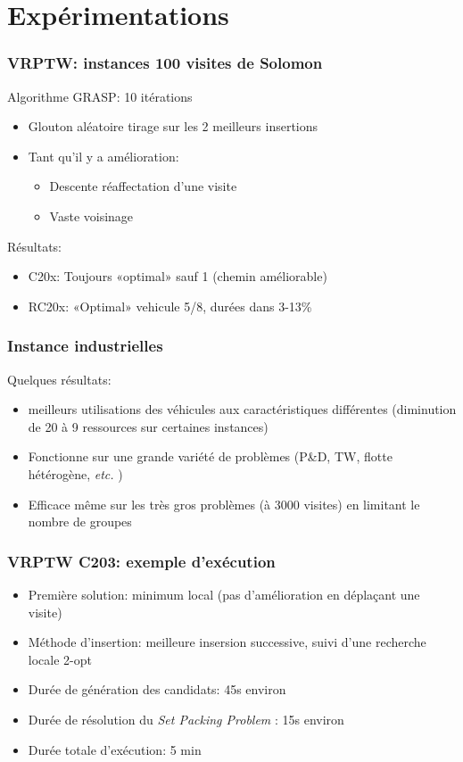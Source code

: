 \documentclass[table]{beamer}
\newcommand*{\foreign}[2][english]{%
    \emph{\foreignlanguage{#1}{#2}}%
}
\begin{document}
\section{Expérimentations}

\begin{frame}
  \frametitle{VRPTW: instances 100 visites de Solomon}

  Algorithme GRASP: 10 itérations
  \begin{itemize}
  \item Glouton aléatoire tirage sur les 2 meilleurs insertions
  \item Tant qu'il y a amélioration:
    \begin{itemize}
    \item Descente réaffectation d'une visite
    \item Vaste voisinage
    \end{itemize}
  \end{itemize}

  Résultats:
  \begin{itemize}
  \item C20x: Toujours «optimal» sauf 1 (chemin améliorable)
  \item RC20x: «Optimal» vehicule 5/8, durées dans 3-13\%
  \end{itemize}
\end{frame}

\begin{frame}
  \frametitle{Instance industrielles}

  Quelques résultats:
  \begin{itemize}
  \item meilleurs utilisations des véhicules aux caractéristiques
    différentes (diminution de 20 à 9 ressources sur certaines
    instances)
  \item Fonctionne sur une grande variété de problèmes (P\&D, TW,
    flotte hétérogène, \foreign{etc.})
  \item Efficace même sur les très gros problèmes (à 3000 visites) en
    limitant le nombre de groupes
  \end{itemize}
\end{frame}

\begin{frame}
  \frametitle{VRPTW C203: exemple d'exécution}

  \begin{itemize}
  \item Première solution: minimum local (pas d'amélioration en
    déplaçant une visite)
  \item Méthode d'insertion: meilleure insersion successive, suivi
    d'une recherche locale 2-opt
  \item Durée de génération des candidats: 45s environ
  \item Durée de résolution du \foreign{Set Packing Problem}: 15s environ
  \item Durée totale d'exécution: 5 min
  \end{itemize}
\end{frame}
\end{document}
